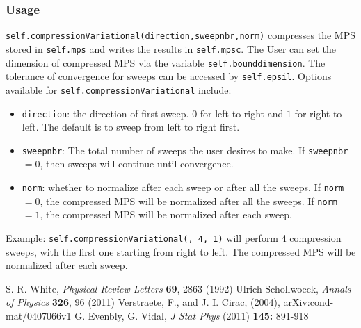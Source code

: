 \documentclass[english]{article}
\begin{document}
\subsubsection{Usage}
\texttt{self.compressionVariational(direction,sweep\textunderscore nbr,norm)} compresses the MPS stored in \texttt{self.mps} and writes the results in \texttt{self.mpsc}. The User can set the dimension of compressed MPS via the variable \texttt{self.bound\textunderscore dimension}. The tolerance of convergence for sweeps can be accessed by \texttt{self.epsil}.  Options available for \texttt{self.compressionVariational} include:
\begin{itemize}
\item \texttt{direction}: the direction of first sweep. $0$ for left to right and $1$ for right to left. The default is to sweep from left to right first.
\item \texttt{sweep\textunderscore nbr}: The total number of sweeps the user desires to make. If  \texttt{sweep\textunderscore nbr}$ =0$, then sweeps will continue until convergence.
\item \texttt{norm}: whether to normalize after each sweep or after all the sweeps. If \texttt{norm} $=0$, the compressed MPS will be normalized after all the sweeps. If \texttt{norm} $=1$, the compressed MPS will be normalized after each sweep.
\end{itemize}
Example: \texttt{self.compressionVariational(, 4, 1)} will perform 4 compression sweeps, with the first one starting from right to left. The compressed MPS will be normalized after each sweep.




\begin{thebibliography}{99}
 S. R. White, {\it Physical Review Letters} {\bf 69}, 2863 (1992)
 Ulrich Schollwoeck, {\it Annals of Physics} {\bf 326}, 96 (2011)
 Verstraete, F., and J. I. Cirac, (2004), arXiv:cond-mat/0407066v1
G. Evenbly, G. Vidal, {\it J Stat Phys} (2011) {\bf 145:} 891-918
\end{thebibliography}
\end{document}
